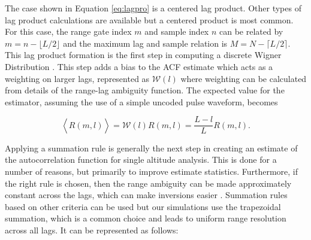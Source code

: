 The case shown in Equation \ref{eq:lagpro} is a centered lag product.  Other types of lag product calculations are available but a centered product is most common. For this case, the range gate index $m$ and sample index $n$ can be related by $m=n-\lfloor L/2\rfloor$ and the maximum lag and sample relation is $M=N-\lceil L/2 \rceil$.  This lag product formation is the first step in computing a discrete Wigner Distribution \cite{TFAcohen}. This  step adds a bias to the ACF estimate which acts as a weighting on larger lags, represented as $\mathcal{W}(l)$ where weighting can be calculated from details of the range-lag ambiguity function. The expected value for the estimator, assuming the use of a simple uncoded pulse waveform, becomes

\begin{equation}
\label{eq:lagprobias}
\left\langle\widehat{R}(m,l) \right\rangle = \mathcal{W}(l)R(m,l) =\frac{L-l}{L}R(m,l).
\end{equation}

%
%

Applying a summation rule is generally the next step in creating an estimate of the autocorrelation function for single altitude analysis. This is done for a number of reasons, but primarily to improve estimate statistics.  Furthermore, if the right rule is chosen, then the range ambiguity can be made approximately constant across the lags, which can make inversions easier \cite{nygren1996}. Summation rules based on other criteria can be used but our simulations use the trapezoidal summation, which is a common choice and leads to uniform range resolution across all lags. It can be represented as follows:

